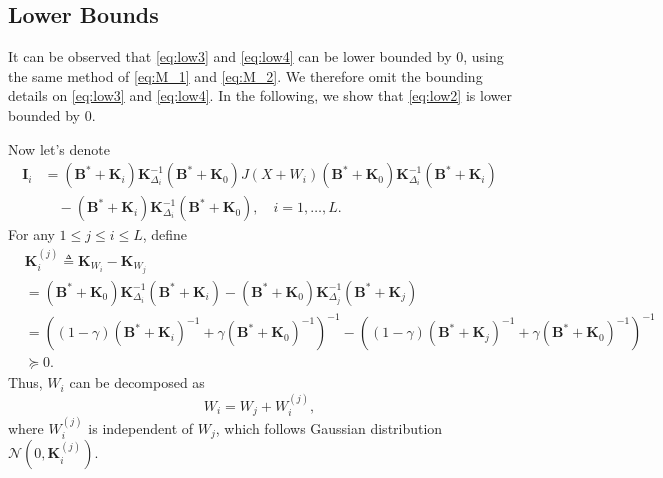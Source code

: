 \documentclass[journal,final, onecolumn]{IEEEtran}
\begin{document}
\subsection{Lower Bounds}
It can be observed that \eqref{eq:low3} and \eqref{eq:low4} can be lower bounded by $0$, using the same method of \eqref{eq:M_1} and \eqref{eq:M_2}. We therefore omit the bounding details on \eqref{eq:low3} and \eqref{eq:low4}. In the following, we show that \eqref{eq:low2} is lower bounded by $0$.

Now let's denote
\begin{align}
\boldsymbol{I}_{i}&=(\boldsymbol{B}^{*} + \boldsymbol{K}_{i}) \boldsymbol{K}^{-1}_{\Delta_{i}}(\boldsymbol{B}^{*} + \boldsymbol{K}_{0}) J(X+W_i)(\boldsymbol{B}^{*} + \boldsymbol{K}_{0}) \boldsymbol{K}^{-1}_{\Delta_{i}}(\boldsymbol{B}^{*} + \boldsymbol{K}_{i})\nonumber \\
&\quad  -(\boldsymbol{B}^{*} + \boldsymbol{K}_{i}) \boldsymbol{K}^{-1}_{\Delta_{i}}(\boldsymbol{B}^{*} + \boldsymbol{K}_{0}), \quad i=1,\ldots,L.
\end{align}
For any $1 \leq j \leq i \leq L $, define
\begin{align}
&\boldsymbol{K}^{(j)}_{i} \triangleq \boldsymbol{K}_{W_i} - \boldsymbol{K}_{W_j} \\
&=(\boldsymbol{B}^{*} + \boldsymbol{K}_{0}) \boldsymbol{K}^{-1}_{\Delta_{i}}(\boldsymbol{B}^{*} + \boldsymbol{K}_{i}) - (\boldsymbol{B}^{*} + \boldsymbol{K}_{0}) \boldsymbol{K}^{-1}_{\Delta_{j}}(\boldsymbol{B}^{*} + \boldsymbol{K}_{j})\\
&=\left(   {(1-\gamma)}(\boldsymbol{B}^{*} + \boldsymbol{K}_{i})^{-1} +  \gamma (\boldsymbol{B}^{*} + \boldsymbol{K}_{0})^{-1}           \right)^{-1} - \left(   {(1-\gamma)}(\boldsymbol{B}^{*} + \boldsymbol{K}_{j})^{-1} +  \gamma (\boldsymbol{B}^{*} + \boldsymbol{K}_{0})^{-1}           \right)^{-1}\\
& \succeq 0.
\end{align}
Thus, $W_{i}$ can be decomposed as
\begin{equation}
W_{i} = W_{j} + W^{(j)}_{i},
\end{equation}
where $W^{(j)}_{i}$ is independent of $W_{j}$, which follows Gaussian distribution $\mathcal{N}(0, \boldsymbol{K}^{(j)}_{i})$.
\end{document}
